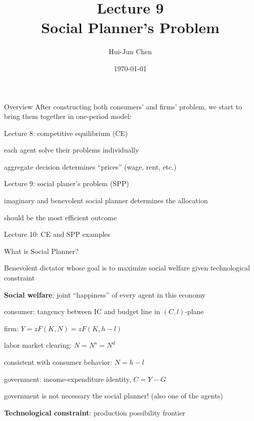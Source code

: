 \documentclass[11pt,aspectratio=169,usenames,dvipsnames]{beamer}
\title[Lecture 9]{Lecture 9 \\ Social Planner's Problem}
\author[Hui-Jun Chen]{Hui-Jun Chen}
\institute[NTHU]{National Tsing Hua University}
\date{\today}
\let\tempone\itemize
\let\temptwo\enditemize
\renewenvironment{itemize}{\tempone\addtolength{\itemsep}{\fill}}{\temptwo}
\begin{document}
\begin{frame}[plain]
    \titlepage
\end{frame}

\begin{frame}{Overview}
\label{slide:Overview}
    After constructing both \alert{consumers'} and \alert{firms'} problem, we start to bring them together in \alert{one-period model}:
    \begin{itemize}
        \item Lecture 8: \alert{competitive equilibrium} (CE)
        \begin{itemize}
            \item each agent solve their problems individually
            \item aggregate decision determines ``prices'' (wage, rent, etc.)
        \end{itemize}
        \item Lecture 9: \alert{social planer's problem} (SPP)
        \begin{itemize}
            \item imaginary and benevolent social planner determines the allocation
            \item should be the most efficient outcome
        \end{itemize}
        \item Lecture 10: CE and SPP examples
    \end{itemize}
\end{frame}

\begin{frame}{What is Social Planner?}
\label{slide:What_is_Social_Planner_}
\begin{itemize}
    \item \alert{Benevolent dictator} whose goal is to maximize \alert{social welfare} given \alert{technological constraint}
    \item \textbf{Social welfare}: joint ``happiness'' of every agent in this economy
    \begin{itemize}
        \item \alert{consumer}: tangency between IC and budget line in $ ( C, l ) $-plane
        \item \alert{firm}: $ Y = z F( K, N ) = z F( K, h-l ) $
        \begin{itemize}
            \item labor market clearing: $ N = N^{s} = N^{d} $
            \item consistent with consumer behavior: $ N = h - l $
        \end{itemize}
        \item \alert{government}: income-expenditure identity, $ C = Y - G $
        \begin{itemize}
            \item government is not necessary the social planner! (also one of the agents)
        \end{itemize}
    \end{itemize}
    \item \textbf{Technological constraint}: production possibility frontier
\end{itemize}
\end{frame}
\end{document}
